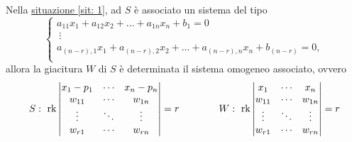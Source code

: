 \documentclass{article}     %
\newcommand\sitref[1]{\hyperref[sit: #1]{situazione \ref*{sit: #1}}}
\begin{document}
\begin{oss}
    Nella \sitref{1}, ad $S$ è associato un sistema del tipo 
    \[\begin{cases}
        a_{11}x_1+a_{12}x_2+\dots+a_{1n}x_n+b_1=0\\
        ~\vdots\\
        a_{(n-r),1}x_1+a_{(n-r),2}x_2+\dots+a_{(n-r),n}x_n+b_{(n-r)}=0,\\
    \end{cases}\]
    allora la giacitura $W$ di $S$ è determinata il sistema omogeneo associato, ovvero 
    \[S:~\operatorname{rk}\begin{vmatrix}
        x_1-p_1&\cdots&x_n-p_n\\
        w_{11}&\cdots& w_{1n}\\
        \vdots& \ddots & \vdots \\
        w_{r1}&\cdots& w_{rn}\\
    \end{vmatrix}=r\qquad \qquad W:~\operatorname{rk}\begin{vmatrix}
        x_1&\cdots&x_n\\
        w_{11}&\cdots& w_{1n}\\
        \vdots& \ddots & \vdots \\
        w_{r1}&\cdots& w_{rn}\\
    \end{vmatrix}=r\]
\end{oss}
\end{document}
